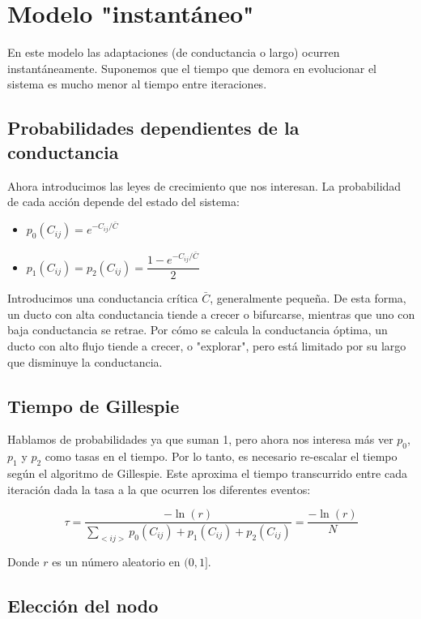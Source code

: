\documentclass{article}
\begin{document}
\section{Modelo "instantáneo"}

En este modelo las adaptaciones (de conductancia o largo) ocurren instantáneamente. Suponemos que el tiempo que demora en evolucionar el sistema es mucho menor al tiempo entre iteraciones.

\subsection{Probabilidades dependientes de la conductancia}

Ahora introducimos las leyes de crecimiento que nos interesan. La probabilidad de cada acción depende del estado del sistema:

\begin{itemize}
    \item $p_0(C_{ij}) = e^{-C_{ij}/\bar{C}}$
    \item $p_1(C_{ij}) = p_2(C_{ij}) = \dfrac{1 - e^{-C_{ij}/\bar{C}}}{2}$
\end{itemize}

Introducimos una conductancia crítica $\bar{C}$, generalmente pequeña. De esta forma, un ducto con alta conductancia tiende a crecer o bifurcarse, mientras que uno con baja conductancia se retrae. Por cómo se calcula la conductancia óptima, un ducto con alto flujo tiende a crecer, o "explorar", pero está limitado por su largo que disminuye la conductancia.

\subsection{Tiempo de Gillespie}

Hablamos de probabilidades ya que suman 1, pero ahora nos interesa más ver $p_0$, $p_1$ y $p_2$ como tasas en el tiempo. Por lo tanto, es necesario re-escalar el tiempo según el algoritmo de Gillespie. Este aproxima el tiempo transcurrido entre cada iteración dada la tasa a la que ocurren los diferentes eventos:

$$ \tau = \frac{-\ln(r)}{\sum_{<ij>}p_0(C_{ij}) + p_1(C_{ij}) + p_2(C_{ij})} = \frac{-\ln(r)}{N}$$

Donde $r$ es un número aleatorio en $(0,1]$.

\subsection{Elección del nodo}
\end{document}

